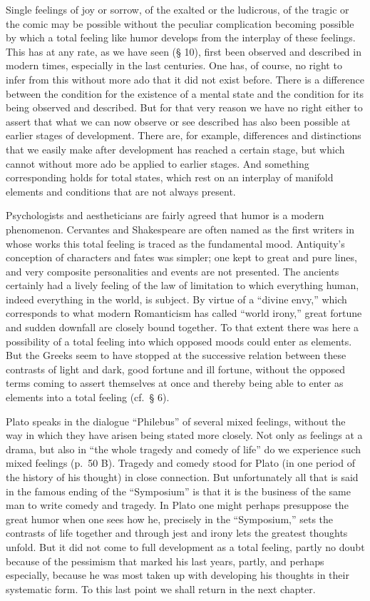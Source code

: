 \documentclass[12pt]{book}
\newcommand{\opage}[1]{\marginnote{\footnotesize\textit{[#1]}}}
\begin{document}
\opage{136}Single feelings of joy or sorrow, of the exalted or the ludicrous, of the tragic or
the comic may be possible without the peculiar complication becoming possible by which a total
feeling like humor develops from the interplay of these feelings. This has at any rate, as we
have seen (§ 10), first been observed and described in modern times, especially in the last
centuries. One has, of course, no right to infer from this without more ado that it did not
exist before. There is a difference between the condition for the existence of a mental state
and the condition for its being observed and described. But for that very reason we have no
right either to assert that what we can now observe or see described has also been possible at
earlier stages of development. There are, for example, differences and distinctions that we
easily make after development has reached a certain stage, but which cannot without more ado be
applied to earlier stages. And something corresponding holds for total states, which rest on an
interplay of manifold elements and conditions that are not always present.

Psychologists and aestheticians are fairly agreed that humor is a modern phenomenon. Cervantes
and Shakespeare are often named as the first writers in whose works this total feeling is
traced as the fundamental mood. Antiquity's conception of characters and fates was simpler;
one kept to great and pure lines, and very composite personalities and events are not
presented. The ancients certainly had a lively feeling of the law of limitation to which
everything human, indeed everything in the world, is subject. By virtue of a ``divine envy,''
which corresponds to what modern Romanticism has called ``world irony,'' great fortune and
sudden downfall are closely bound together. To that extent there was here a possibility of a
total feeling into which opposed moods could enter as elements. But the Greeks seem to have
stopped at the successive relation between these contrasts of light and dark, good fortune and
ill fortune, without the opposed terms coming to assert themselves at once and thereby being
able to enter as elements into a total feeling (cf.\ § 6).

Plato speaks in the dialogue ``Philebus'' of several mixed feelings, without the way in which
they have arisen being stated more closely. Not only as feelings at a drama, but also in ``the
\opage{137}whole tragedy and comedy of life'' do we experience such mixed feelings (p.~50 B).
Tragedy and comedy stood for Plato (in one period of the history of his thought) in close
connection. But unfortunately all that is said in the famous ending of the ``Symposium'' is that
it is the business of the same man to write comedy and tragedy.
In Plato one might perhaps presuppose the great humor when one sees how he, precisely in the
``Symposium,'' sets the contrasts of life together and through jest and irony lets the
greatest thoughts unfold. But it did not come to full development as a total feeling, partly
no doubt because of the pessimism that marked his last years, partly, and perhaps especially,
because he was most taken up with developing his thoughts in their systematic form. To this
last point we shall return in the next chapter.
\end{document}
